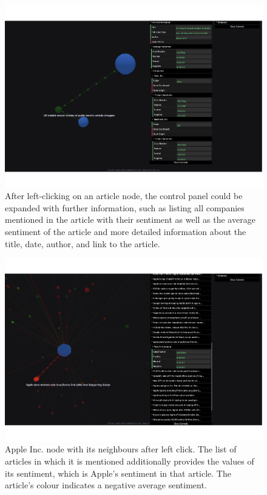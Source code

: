 \begin{figure}[htbp]
    \centering
    \includegraphics[width=\textwidth]{img/user/graphs-article-a.pdf}
    \caption{After left-clicking on an article node, the control panel could be expanded with further information, such as listing all companies mentioned in the article with their sentiment as well as the average sentiment of the article and more detailed information about the title, date, author, and link to the article.}
    \label{fig:user-documentation-graphs-article}
\end{figure}

\begin{figure}[htbp]
    \centering
    \includegraphics[width=\textwidth]{img/user/graphs-apple-negative-a.pdf}
    \caption{Apple Inc. node with its neighbours after left click. The list of articles in which it is mentioned additionally provides the values of its sentiment, which is Apple's sentiment in that article. The article's colour indicates a negative average sentiment.}
    \label{fig:user-documentation-graphs-apple-negative}
\end{figure}

